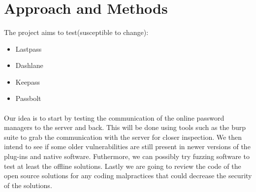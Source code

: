 \section{Approach and Methods}
\paragraph{}
The project aims to test(susceptible to change):
\begin{itemize}
    \item Lastpass
    \item Dashlane
    \item Keepass
    \item Passbolt
\end{itemize}

\paragraph{}
Our idea is to start by testing the communication of the online password managers to the server and back. This will be done using tools such as the burp suite to grab the communication with the server for closer inspection. We then intend to see if some older vulnerabilities are still present in newer versions of the plug-ins and native software. Futhermore, we can possibly try fuzzing software to test at least the offline solutions. Lastly we are going to review the code of the open source solutions for any coding malpractices that could decrease the security of the solutions.
